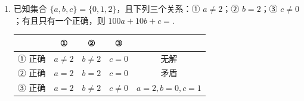 \documentclass[a4paper,11pt]{article}
\begin{document}
\begin{enumerate}
\item 已知集合 $\{a,b,c\}=\{0,1,2\}$，且下列三个关系：① $a\neq2$；② $b=2$；③ $c\neq0$；有且只有一个正确，则 $100a+10b+c=$\blankline[4.4em].

\ifanswer
\solbegin
{}
\begin{center}
\begin{tabular}{|c|c|c|c|c|}
\hline
 & ① & ② & ③ & \\
\hline
① 正确 & $a\neq2$ & $b\neq2$ & $c=0$ & 无解\\
\hline
② 正确 & $a=2$ & $b=2$ & $c=0$ & 矛盾\\
\hline
③ 正确 & $a=2$ & $b\neq2$ & $c\neq0$ & $a=2,b=0,c=1$\\
\hline
\end{tabular}
\end{center}
\solend
\fi

\end{enumerate}

\end{document}
